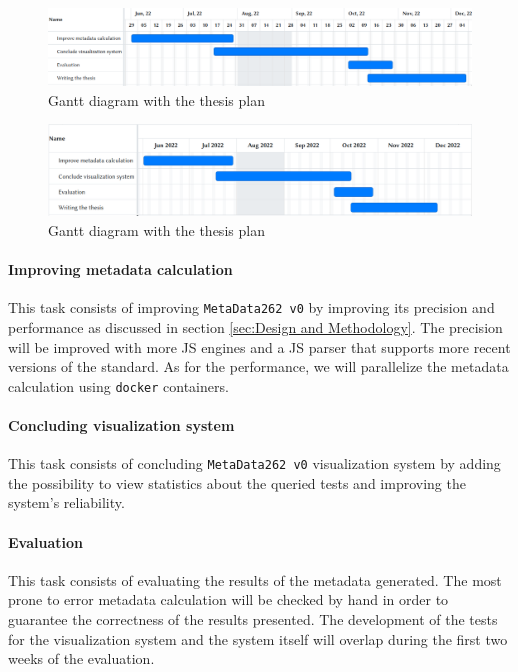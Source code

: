 \documentclass[runningheads]{llncs}
\begin{document}
\begin{figure}[ht]
    \centering
    \includegraphics[width=1\textwidth]{images/gantt_thesis.png}
    \caption{Gantt diagram with the thesis plan}
    \label{fig:gantt}
\end{figure}

\begin{figure}[ht]
    \centering
    \includegraphics[width=1\textwidth]{images/gantt_thesis_month.png}
    \caption{Gantt diagram with the thesis plan}
    \label{fig:gantt_month}
\end{figure}



\paragraph{Improving metadata calculation}
This task consists of improving \texttt{MetaData262 v0} by improving its precision and performance as discussed in section \ref{sec:Design and Methodology}. The precision will be improved with more JS engines and a JS parser that supports more recent versions of the standard. As for the performance, we will parallelize the metadata calculation using \texttt{docker} containers.


\paragraph{Concluding visualization system}
This task consists of concluding \texttt{MetaData262 v0} visualization system by adding the possibility to view statistics about the queried tests and improving the system's reliability.


\paragraph{Evaluation}
This task consists of evaluating the results of the metadata generated. The most prone to error metadata calculation will be checked by hand in order to guarantee the correctness of the results presented. The development of the tests for the visualization system and the system itself will overlap during the first two weeks of the evaluation.
\end{document}
